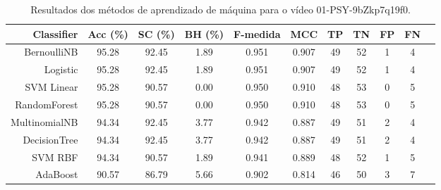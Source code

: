 \begin{table}[!htb]
\centering
\caption{Resultados dos métodos de aprendizado de máquina para o vídeo 01-PSY-9bZkp7q19f0.}
\label{tab:01-PSY-9bZkp7q19f0}
\begin{tabular}{r|c|c|c|c|c|c|c|c|c|c}
\hline\hline
Classifier & Acc (\%) & SC (\%) & BH (\%) & F-medida & MCC & TP & TN & FP & FN \\ \hline
BernoulliNB & 95.28 & 92.45 & 1.89 & 0.951 & 0.907 & 49 & 52 & 1 & 4 \\ 
Logistic & 95.28 & 92.45 & 1.89 & 0.951 & 0.907 & 49 & 52 & 1 & 4 \\ 
SVM Linear & 95.28 & 90.57 & 0.00 & 0.950 & 0.910 & 48 & 53 & 0 & 5 \\ 
RandomForest & 95.28 & 90.57 & 0.00 & 0.950 & 0.910 & 48 & 53 & 0 & 5 \\ 
MultinomialNB & 94.34 & 92.45 & 3.77 & 0.942 & 0.887 & 49 & 51 & 2 & 4 \\ 
DecisionTree & 94.34 & 92.45 & 3.77 & 0.942 & 0.887 & 49 & 51 & 2 & 4 \\ 
SVM RBF & 94.34 & 90.57 & 1.89 & 0.941 & 0.889 & 48 & 52 & 1 & 5 \\ 
AdaBoost & 90.57 & 86.79 & 5.66 & 0.902 & 0.814 & 46 & 50 & 3 & 7 \\ 
\hline\hline
\end{tabular}
\end{table}
